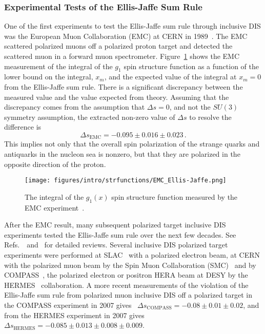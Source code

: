   \subsubsection{Experimental Tests of the Ellis-Jaffe Sum Rule}
  One of the first experiments to test the Ellis-Jaffe sum rule through
  inclusive DIS was the European Muon Collaboration (EMC) at CERN in
  1989~\cite{Ashman:1987hv,Ashman:1989ig}. The EMC scattered polarized muons
  off a polarized proton target and detected the scattered muon in a forward
  muon spectrometer. Figure~\ref{fig:emcej} shows the EMC measurement of the
  integral of the $g_1$ spin structure function as a function of the lower
  bound on the integral, $x_m$, and the expected value of the integral at $x_m
  = 0$ from the Ellis-Jaffe sum rule. There is a significant discrepancy
  between the measured value and the value expected from theory. Assuming that
  the discrepancy comes from the assumption that $\Delta s = 0$, and not the
  $SU(3)$ symmetry assumption, the extracted non-zero value of $\Delta s$ to
  resolve the difference is
  \begin{equation}
    \Delta s_{\textrm{EMC}} = -0.095 \pm 0.016 \pm 0.023 \,.
  \end{equation}
  This implies not only that the overall spin polarization of the strange
  quarks and antiquarks in the nucleon sea is nonzero, but that they are
  polarized in the opposite direction of the proton.
  \begin{figure}[h]
    \centering
    \texttt{[image: figures/intro/strfunctions/EMC\_Ellis-Jaffe.png]}
    \caption{The integral of the $g_1(x)$ spin structure function measured by
      the EMC experiment~\cite{Ashman:1989ig}.}
    \label{fig:emcej}
  \end{figure}

  After the EMC result, many subsequent polarized target inclusive DIS
  experiments tested the Ellis-Jaffe sum rule over the next few decades.
  See Refs.~\cite{Aidala:2012mv}~and~\cite{Bass:2007zzb} for detailed reviews.
  Several inclusive DIS polarized target experiments were performed at
  SLAC~\cite{Baum:1983ha,Anthony:1996mw,Abe:1998wq} with a polarized electron
  beam, at CERN with the polarized muon beam by the Spin Muon Collaboration
  (SMC)~\cite{Adeva:1993km,Adeva:1998vv} and by
  COMPASS~\cite{Alexakhin:2006oza}, the polarized electron or positron HERA
  beam at DESY by the
  HERMES~\cite{Ackerstaff:1997ws,Ackerstaff:1999ey,Airapetian:2006vy}
  collaboration. A more recent measurements of the violation of the Ellis-Jaffe
  sum rule from polarized muon inclusive DIS off a polarized target in the
  COMPASS experiment in 2007 gives~\cite{Alexakhin:2006oza} $\Delta
  s_{\textrm{COMPASS}} = -0.08 \pm 0.01 \pm 0.02$, and from the HERMES
  experiment in 2007 gives~\cite{Airapetian:2006vy} $\Delta s_{\textrm{HERMES}}
  = -0.085 \pm 0.013 \pm 0.008 \pm 0.009$.

